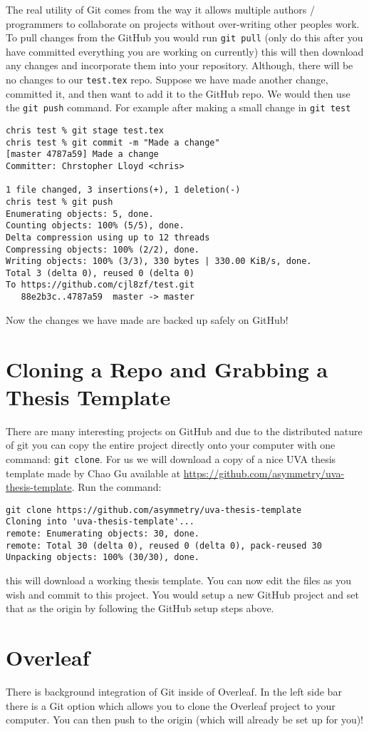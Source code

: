 \documentclass{article}
\begin{document}
The real utility of Git comes from the way it allows multiple authors
/ programmers to collaborate on projects without over-writing other
peoples work. To pull changes from the GitHub you would run
\lstinline{git pull} (only do this after you have committed
everything you are working on currently) this will then download any
changes and incorporate them into your repository. Although, there
will be no changes to our \lstinline{test.tex} repo. Suppose we have
made another change, committed it, and then want to add it to the
GitHub repo. We would then use the \lstinline{git push} command. For
example after making a small change in \lstinline{git test}
\begin{lstlisting}
chris test % git stage test.tex
chris test % git commit -m "Made a change"
[master 4787a59] Made a change
Committer: Chrstopher Lloyd <chris>

1 file changed, 3 insertions(+), 1 deletion(-)
chris test % git push
Enumerating objects: 5, done.
Counting objects: 100% (5/5), done.
Delta compression using up to 12 threads
Compressing objects: 100% (2/2), done.
Writing objects: 100% (3/3), 330 bytes | 330.00 KiB/s, done.
Total 3 (delta 0), reused 0 (delta 0)
To https://github.com/cjl8zf/test.git
   88e2b3c..4787a59  master -> master
\end{lstlisting}

Now the changes we have made are backed up safely on GitHub!

\section{Cloning a Repo and Grabbing a Thesis Template}
There are many interesting projects on GitHub and due to the
distributed nature of git you can copy the entire project directly
onto your computer with one command: \lstinline{git clone}. For us we
will download a copy of a nice UVA thesis template made by Chao Gu
available at
\href{https://github.com/asymmetry/uva-thesis-template}{https://github.com/asymmetry/uva-thesis-template}. Run
the command:
\begin{lstlisting}
git clone https://github.com/asymmetry/uva-thesis-template
Cloning into 'uva-thesis-template'...
remote: Enumerating objects: 30, done.
remote: Total 30 (delta 0), reused 0 (delta 0), pack-reused 30
Unpacking objects: 100% (30/30), done.
\end{lstlisting}
this will download a working thesis template. You can now edit the
files as you wish and commit to this project. You would setup a new
GitHub project and set that as the origin by following the GitHub
setup steps above.

\section{Overleaf}
There is background integration of Git inside of Overleaf. In the left
side bar there is a Git option which allows you to clone the Overleaf
project to your computer. You can then push to the origin (which will
already be set up for you)!
\end{document}
